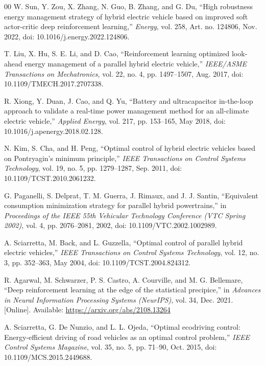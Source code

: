 \documentclass{ieeeaccess}
\begin{document}
\begin{thebibliography}{00}
 W. Sun, Y. Zou, X. Zhang, N. Guo, B. Zhang, and G. Du, ``High robustness energy management strategy of hybrid electric vehicle based on improved soft actor-critic deep reinforcement learning,'' \emph{Energy}, vol. 258, Art. no. 124806, Nov. 2022, doi: 10.1016/j.energy.2022.124806.

 T. Liu, X. Hu, S. E. Li, and D. Cao, ``Reinforcement learning optimized look-ahead energy management of a parallel hybrid electric vehicle,'' \emph{IEEE/ASME Transactions on Mechatronics}, vol. 22, no. 4, pp. 1497--1507, Aug. 2017, doi: 10.1109/TMECH.2017.2707338.

 R. Xiong, Y. Duan, J. Cao, and Q. Yu, ``Battery and ultracapacitor in-the-loop approach to validate a real-time power management method for an all-climate electric vehicle,'' \emph{Applied Energy}, vol. 217, pp. 153--165, May 2018, doi: 10.1016/j.apenergy.2018.02.128.

 N. Kim, S. Cha, and H. Peng, ``Optimal control of hybrid electric vehicles based on Pontryagin's minimum principle,'' \emph{IEEE Transactions on Control Systems Technology}, vol. 19, no. 5, pp. 1279--1287, Sep. 2011, doi: 10.1109/TCST.2010.2061232.

 G. Paganelli, S. Delprat, T. M. Guerra, J. Rimaux, and J. J. Santin, ``Equivalent consumption minimization strategy for parallel hybrid powertrains,'' in \emph{Proceedings of the IEEE 55th Vehicular Technology Conference (VTC Spring 2002)}, vol. 4, pp. 2076--2081, 2002, doi: 10.1109/VTC.2002.1002989.

 A. Sciarretta, M. Back, and L. Guzzella, ``Optimal control of parallel hybrid electric vehicles,'' \emph{IEEE Transactions on Control Systems Technology}, vol. 12, no. 3, pp. 352--363, May 2004, doi: 10.1109/TCST.2004.824312.

 R. Agarwal, M. Schwarzer, P. S. Castro, A. Courville, and M. G. Bellemare, ``Deep reinforcement learning at the edge of the statistical precipice,'' in \emph{Advances in Neural Information Processing Systems (NeurIPS)}, vol. 34, Dec. 2021. [Online]. Available: \url{https://arxiv.org/abs/2108.13264}

 A. Sciarretta, G. De Nunzio, and L. L. Ojeda, ``Optimal ecodriving control: Energy-efficient driving of road vehicles as an optimal control problem,'' \emph{IEEE Control Systems Magazine}, vol. 35, no. 5, pp. 71--90, Oct. 2015, doi: 10.1109/MCS.2015.2449688.


\end{thebibliography}
\end{document}
